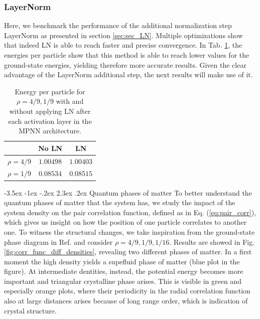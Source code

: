 \documentclass[a4paper, 12pt, oneside]{article}
\makeatletter
\renewcommand{\subsection}{\@startsection{subsection}{1}{\z@}%
             {-3.5ex \@plus-1ex \@minus-.2ex}%
             {2.3ex \@plus.2ex}%
             {\normalfont\normalsize\bfseries}}
\makeatother
\begin{document}
\subsubsection*{LayerNorm} Here, we benchmark the performance of the additional normalization step 
LayerNorm as presented in section \ref{sec:sec_LN}. Multiple optimizations show that indeed LN is able to reach 
faster and precise convergence. In Tab. \ref{tab:tab_LN}, the energies per particle show that this method is able to reach 
lower values for the ground-state energies, yielding therefore more accurate results. Given the clear advantage of the LayerNorm 
additional step, the next results will make use of it.
\begin{table}[H]
    \centering
    \captionsetup{width=0.7\textwidth}
    \caption{\label{tab:tab_LN} Energy per particle for $\rho = 4/9, 1/9$ with and without applying LN after each activation 
    layer in the MPNN architecture.}
    \begin{tabular}{|c|c|c|}
        \hline
        & No \textbf{LN} & \textbf{LN} \\
        \hline
        \hline
        $\rho = 4/9$ & $1.00498$ & $1.00403$ \\
        \hline
        $\rho = 1/9$ &  $0.08534$ & $0.08515$ \\
        \hline
    \end{tabular}

\end{table}

\subsection{Quantum phases of matter}
To better understand the quantum phases of matter that the system has, we study the impact of the system density 
on the pair correlation function, defined as in Eq. (\ref{eq:pair_corr}), which gives us insight on how the position 
of one particle correlates to another one. To witness the structural changes, we take inspiration from 
the ground-state phase diagram in Ref. \cite{kroiss_2016} and consider $\rho=4/9,1/9,1/16$. Results are showed in 
Fig. \ref{fig:corr_func_diff_densities}, revealing two different phases of matter. 
In a first moment the high density yields a supefluid phase of matter (blue plot in the figure). At 
intermediate dentities, instead, the potential energy becomes more important and triangular 
crystalline phase arises. This is visible in green and especially orange plots, where their periodicity in the radial correlation function also at large distances arises because of long range order, which is 
indication of crystal structure.
\end{document}
